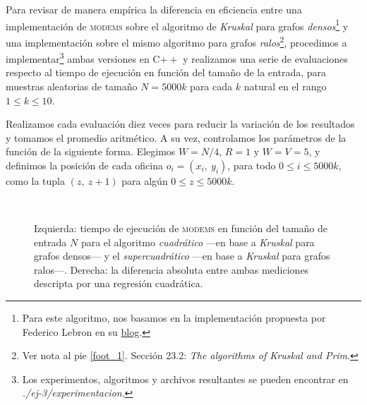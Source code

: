 

Para revisar de manera empírica la diferencia en eficiencia entre una implementación de \textsc{modems} sobre el algoritmo de \textit{Kruskal} para grafos \textit{densos}\footnote{Para este algoritmo, nos basamos en la implementación propuesta por Federico Lebron en su \href{https://fedelebron.com/a-dense-version-of-kruskals-algorithm}{\color{blue} blog}.} y una implementación sobre el mismo algoritmo para grafos \textit{ralos}\footnote{Ver nota al pie \ref{foot_1}. Sección 23.2: \textit{The algorithms of Kruskal and Prim}.}, procedimos a implementar\footnote{Los experimentos, algoritmos y archivos resultantes se pueden encontrar en \textit{./ej-3/experimentacion}.} ambas versiones en C$++$ y realizamos una serie de evaluaciones respecto al tiempo de ejecución en función del tamaño de la entrada, para muestras aleatorias de tamaño $N = 5000k$ para cada $k$ natural en el rango $1 \leq k \leq 10$. 

Realizamos cada evaluación diez veces para reducir la variación de los resultados y tomamos el promedio aritmético. 
A su vez, controlamos los parámetros de la función de la siguiente forma. Elegimos \mbox{$W = N/4$}, $R = 1$ y $W = V = 5$, y definimos la posición de cada oficina $o_i = (x_i,\ y_i)$, para todo $0 \leq i \leq 5000k$, como la tupla $(z,\ z+1)$ para algún $0 \leq z \leq 5000k$. 

\begin{figure}[!htbp]
    $\ \ \ \ $

    \caption{Izquierda: tiempo de ejecución de \textsc{modems} en función del tamaño de entrada $N$ para el algoritmo \textit{cuadrático} ---en base a \textit{Kruskal} para grafos densos--- y el \textit{supercuadrático} ---en base a \textit{Kruskal} para grafos ralos---. Derecha: la diferencia absoluta entre ambas mediciones descripta por una regresión cuadrática.}
    \label{grafico_1}
\end{figure}

